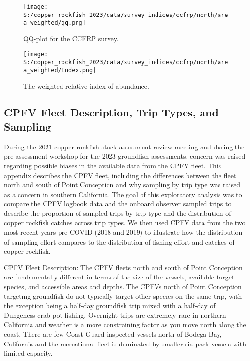 \documentclass[11pt,
  letterpaper,
]{article}
\begin{document}
\newpage

\begin{figure}
{\centering
\texttt{[image: S:/copper\_rockfish\_2023/data/survey\_indices/ccfrp/north/area\_weighted/qq.png]}
}
\caption{QQ-plot for the CCFRP survey.\label{fig:ccfrp-qq}}
\end{figure}

\newpage

\begin{figure}
{\centering
\texttt{[image: S:/copper\_rockfish\_2023/data/survey\_indices/ccfrp/north/area\_weighted/Index.png]}
}
\caption{The weighted relative index of abundance.\label{fig:ccfrp-index}}
\end{figure}

\subsection{CPFV Fleet Description, Trip Types, and Sampling}\label{cpfv-samples}

During the 2021 copper rockfish stock assessment review meeting and during the pre-assessment workshop for the 2023 groundfish assessments, concern was raised regarding possible biases in the available data from the CPFV fleet. This appendix describes the CPFV fleet, including the differences between the fleet north and south of Point Conception and why sampling by trip type was raised as a concern in southern California. The goal of this exploratory analysis was to compare the CPFV logbook data and the onboard observer sampled trips to describe the proportion of sampled trips by trip type and the distribution of copper rockfish catches across trip types. We then used CPFV data from the two most recent years pre-COVID (2018 and 2019) to illustrate how the distribution of sampling effort compares to the distribution of fishing effort and catches of copper rockfish.

CPFV Fleet Description: The CPFV fleets north and south of Point Conception are fundamentally different in terms of the size of the vessels, available target species, and accessible areas and depths. The CPFVs north of Point Conception targeting groundfish do not typically target other species on the same trip, with the exception being a half-day groundfish trip mixed with a half-day of Dungeness crab pot fishing. Overnight trips are extremely rare in northern California and weather is a more constraining factor as you move north along the coast. There are few Coast Guard inspected vessels north of Bodega Bay, California and the recreational fleet is dominated by smaller six-pack vessels with limited capacity.
\end{document}
